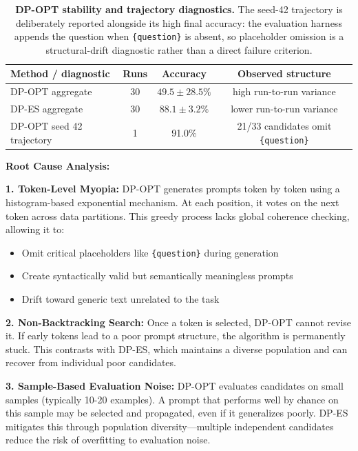 \begin{table}[t]
\centering
\small
\begin{tabular}{lccc}
\toprule
\textbf{Method / diagnostic} & \textbf{Runs} & \textbf{Accuracy} & \textbf{Observed structure} \\
\midrule
DP-OPT aggregate & 30 & $49.5{\pm}28.5\%$ & high run-to-run variance \\
DP-ES aggregate & 30 & $88.1{\pm}3.2\%$ & lower run-to-run variance \\
DP-OPT seed 42 trajectory & 1 & 91.0\% & 21/33 candidates omit \texttt{\{question\}} \\
\bottomrule
\end{tabular}
\caption{\textbf{DP-OPT stability and trajectory diagnostics.} The seed-42 trajectory is deliberately reported alongside its high final accuracy: the evaluation harness appends the question when \texttt{\{question\}} is absent, so placeholder omission is a structural-drift diagnostic rather than a direct failure criterion.}
\label{tab:dpopt_stability}
\end{table}

\noindent \textbf{Root Cause Analysis:}

\noindent \textbf{1. Token-Level Myopia:} DP-OPT generates prompts token by token using a histogram-based exponential mechanism. At each position, it votes on the next token across data partitions. This greedy process lacks global coherence checking, allowing it to:
\begin{itemize}
    \item Omit critical placeholders like \texttt{\{question\}} during generation
    \item Create syntactically valid but semantically meaningless prompts
    \item Drift toward generic text unrelated to the task
\end{itemize}

\noindent \textbf{2. Non-Backtracking Search:} Once a token is selected, DP-OPT cannot revise it. If early tokens lead to a poor prompt structure, the algorithm is permanently stuck. This contrasts with DP-ES, which maintains a diverse population and can recover from individual poor candidates.

\noindent \textbf{3. Sample-Based Evaluation Noise:} DP-OPT evaluates candidates on small samples (typically 10-20 examples). A prompt that performs well by chance on this sample may be selected and propagated, even if it generalizes poorly. DP-ES mitigates this through population diversity—multiple independent candidates reduce the risk of overfitting to evaluation noise.
\vspace{0.4em}

